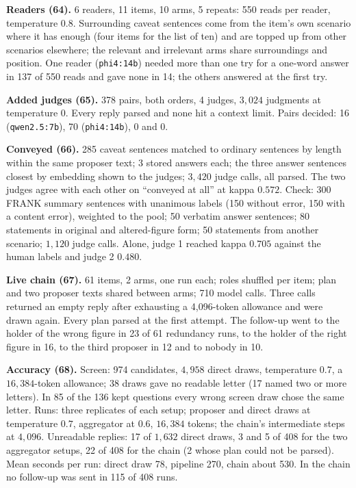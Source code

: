 \documentclass[10pt,twocolumn]{article}
\begin{document}
\textbf{Readers (64).} 6 readers, 11 items, 10 arms, 5 repeats: 550
reads per reader, temperature $0.8$. Surrounding caveat sentences come
from the item's own scenario where it has enough (four items for the
list of ten) and are topped up from other scenarios elsewhere; the relevant and irrelevant
arms share surroundings and position. One reader (\texttt{phi4:14b})
needed more than one try for a one-word answer in 137 of 550 reads and
gave none in 14; the others answered at the first try.

\textbf{Added judges (65).} 378 pairs, both orders, 4 judges, $3{,}024$
judgments at temperature $0$. Every reply parsed and none hit a context
limit. Pairs decided: 16 (\texttt{qwen2.5:7b}), 70 (\texttt{phi4:14b}),
0 and 0.

\textbf{Conveyed (66).} 285 caveat sentences matched to ordinary
sentences by length within the same proposer text; 3 stored answers
each; the three answer sentences closest by embedding shown to the
judges; $3{,}420$ judge calls, all parsed. The two judges agree with
each other on ``conveyed at all'' at kappa $0.572$. Check: 300 FRANK
summary sentences with unanimous labels (150 without error, 150 with a
content error), weighted to the pool; 50 verbatim answer sentences; 80
statements in original and altered-figure form; 50 statements from
another scenario; $1{,}120$ judge calls. Alone, judge 1 reached kappa
$0.705$ against the human labels and judge 2 $0.480$.

\textbf{Live chain (67).} 61 items, 2 arms, one run each; roles
shuffled per item; plan and two proposer texts shared between arms;
710 model calls. Three calls returned an empty reply after exhausting a
4{,}096-token allowance and were drawn again. Every plan parsed at the
first attempt. The follow-up went to the holder of the wrong figure in
23 of 61 redundancy runs, to the holder of the right figure in 16, to
the third proposer in 12 and to nobody in 10.

\textbf{Accuracy (68).} Screen: 974 candidates, $4{,}958$ direct
draws, temperature $0.7$, a $16{,}384$-token allowance; 38 draws gave no
readable letter (17 named two or more letters). In 85 of the 136 kept
questions every wrong screen draw chose the same letter. Runs: three
replicates of each setup; proposer and direct draws at temperature
$0.7$, aggregator at $0.6$, $16{,}384$ tokens; the chain's intermediate
steps at $4{,}096$. Unreadable replies: 17 of $1{,}632$ direct draws, 3
and 5 of 408 for the two aggregator setups, 22 of 408 for the chain (2
whose plan could not be parsed). Mean seconds per run: direct draw 78,
pipeline 270, chain about 530. In the chain no follow-up was sent in
115 of 408 runs.
\end{document}
